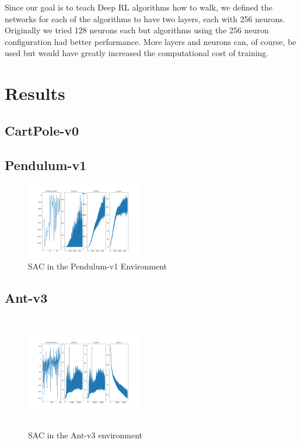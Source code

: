 \documentclass[conference]{IEEEtran}
\begin{document}
Since our goal is to teach Deep RL algorithms how to walk, we defined the networks for each of the algorithms to have
two layers, each with 256 neurons. Originally we tried 128 neurons each but algorithms using the 256 neuron
configuration had better performance. More layers and neurons can, of course, be used but would have greatly increased
the computational cost of training.

\section{Results}

\blindtext

\subsection{CartPole-v0}

\blindtext

\subsection{Pendulum-v1}

\begin{figure}
    \includegraphics[width=0.45\textwidth]{sac-pendulum}
    \caption{SAC in the Pendulum-v1 Environment}
\end{figure}

\blindtext

\subsection{Ant-v3}

\begin{figure}
    \includegraphics[width=0.45\textwidth, height=5cm]{sac-ant}
    \caption{SAC in the Ant-v3 environment}
\end{figure}
\end{document}
